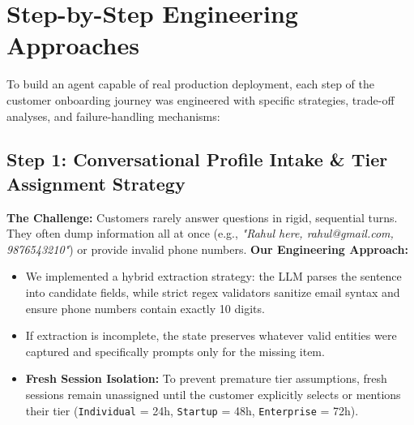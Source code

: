 \documentclass[12pt,a4paper]{article}
\begin{document}

\section{Step-by-Step Engineering Approaches}

To build an agent capable of real production deployment, each step of the customer onboarding journey was engineered with specific strategies, trade-off analyses, and failure-handling mechanisms:

\subsection{Step 1: Conversational Profile Intake \& Tier Assignment Strategy}
\textbf{The Challenge:} Customers rarely answer questions in rigid, sequential turns. They often dump information all at once (e.g., \textit{"Rahul here, rahul@gmail.com, 9876543210"}) or provide invalid phone numbers.
\textbf{Our Engineering Approach:}
\begin{itemize}
    \item We implemented a hybrid extraction strategy: the LLM parses the sentence into candidate fields, while strict regex validators sanitize email syntax and ensure phone numbers contain exactly 10 digits.
    \item If extraction is incomplete, the state preserves whatever valid entities were captured and specifically prompts only for the missing item.
    \item \textbf{Fresh Session Isolation:} To prevent premature tier assumptions, fresh sessions remain unassigned until the customer explicitly selects or mentions their tier (\texttt{Individual} = 24h, \texttt{Startup} = 48h, \texttt{Enterprise} = 72h).
\end{itemize}
\end{document}
